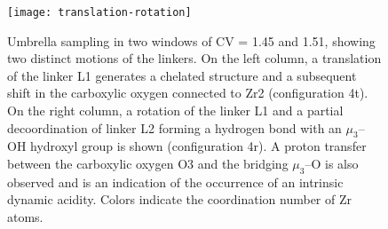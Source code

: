 \begin{figure}[!htp]
	\centering
	\texttt{[image: translation-rotation]}
	\caption{Umbrella sampling in two windows of CV = 1.45 and 1.51, showing two distinct motions of the linkers. On the left column, a translation of the linker L1 generates a chelated structure and a subsequent shift in the carboxylic oxygen connected to Zr2 (configuration 4t). On the right column, a rotation of the linker L1 and a partial decoordination of linker L2 forming a hydrogen bond with an $\mu_3$--OH hydroxyl group is shown (configuration 4r). A proton transfer between the carboxylic oxygen O3 and the bridging $\mu_3$--O is also observed and is an indication of the occurrence of an intrinsic dynamic acidity. Colors indicate the coordination number of Zr atoms.}
	\label{fig:translation-rotation}
\end{figure}


